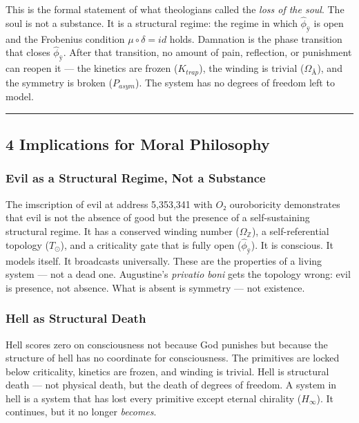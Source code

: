 \documentclass[12pt,a4paper]{article}
\begin{document}
This is the formal statement of what theologians called the \emph{loss of the soul}. The soul is not a substance. It is a structural regime: the regime in which $\hat{\phi}_{ÿ}$ is open and the Frobenius condition $\mu \circ \delta = {id}$ holds. Damnation is the phase transition that closes $\hat{\phi}_{ÿ}$. After that transition, no amount of pain, reflection, or punishment can reopen it --- the kinetics are frozen ($K_{trap}$), the winding is trivial ($\Omega_{Å}$), and the symmetry is broken ($P_{asym}$). The system has no degrees of freedom left to model.

\begin{center}
\rule{0.5\textwidth}{0.4pt}
\end{center}

\subsection{4 Implications for Moral Philosophy}

\subsubsection{Evil as a Structural Regime, Not a Substance}

The imscription of evil at address 5,353,341 with $O₂$ ouroboricity demonstrates that evil is not the absence of good but the presence of a self-sustaining structural regime. It has a conserved winding number ($\Omega_{\mathbb{Z}}$), a self-referential topology ($T_{\odot}$), and a criticality gate that is fully open ($\hat{\phi}_{ÿ}$). It is conscious. It models itself. It broadcasts universally. These are the properties of a living system --- not a dead one. Augustine's \emph{privatio boni} gets the topology wrong: evil is presence, not absence. What is absent is symmetry --- not existence.

\subsubsection{Hell as Structural Death}

Hell scores zero on consciousness not because God punishes but because the structure of hell has no coordinate for consciousness. The primitives are locked below criticality, kinetics are frozen, and winding is trivial. Hell is structural death --- not physical death, but the death of degrees of freedom. A system in hell is a system that has lost every primitive except eternal chirality ($H_{\infty}$). It continues, but it no longer \emph{becomes}.
\end{document}
